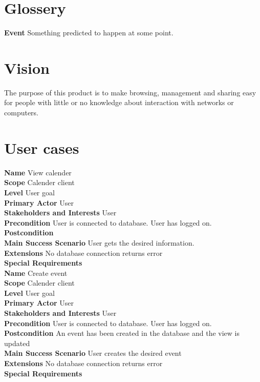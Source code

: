 \documentclass[a4paper,10pt,titlepage]{article}
\begin{document}
\section{Glossery}
	\textbf{Event}
	Something predicted to happen at some point.
	
\section{Vision}
	The purpose of this product is to make browsing, management and sharing easy for people with little or no knowledge about interaction with networks or computers.
	
\section{User cases}
	\textbf{Name}
	View calender
	\\
	\textbf{Scope}
	Calender client
	\\
	\textbf{Level}
	User goal
	\\
	\textbf{Primary Actor}
	User
	\\
	\textbf{Stakeholders and Interests}
	User
	\\
	\textbf{Precondition}
	User is connected to database.
	 User has logged on.
	\\
	\textbf{Postcondition}
	\\
	\textbf{Main Success Scenario}
	User gets the desired information.
	\\
	\textbf{Extensions}
	No database connection returns error
	\\
	\textbf{Special Requirements}
	\\
	
	\textbf{Name}
	Create event
	\\
	\textbf{Scope}
	Calender client
	\\
	\textbf{Level}
	User goal
	\\
	\textbf{Primary Actor}
	User
	\\
	\textbf{Stakeholders and Interests}
	User
	\\
	\textbf{Precondition}
	User is connected to database.
	User has logged on.
	\\
	\textbf{Postcondition}
	An event has been created in the database and the view is updated
	\\
	\textbf{Main Success Scenario}
	User creates the desired event
	\\
	\textbf{Extensions}
	No database connection returns error
	\\
	\textbf{Special Requirements}
	\\
	
\end{document}
